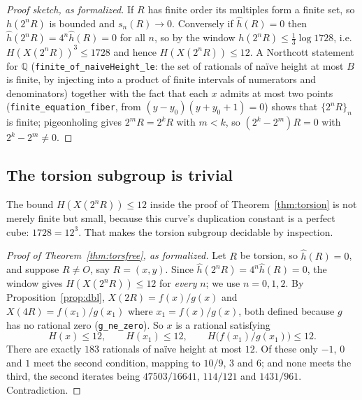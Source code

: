 \documentclass[11pt,reqno]{amsart}
\theoremstyle{plain}
\theoremstyle{definition}
\theoremstyle{remark}
\DeclareRobustCommand{\lt}[1]{\texttt{#1}}
\newcommand{\hh}{\widehat{h}}
\newcommand{\nh}{H}
\begin{document}
\begin{proof}[Proof sketch, as formalized]
If $R$ has finite order its multiples form a finite set, so $h(2^nR)$ is
bounded and $s_n(R) \to 0$. Conversely if $\hh(R) = 0$ then
$\hh(2^nR) = 4^n \hh(R) = 0$ for all $n$, so by the window
$h(2^nR) \le \tfrac13\log 1728$, i.e. $\nh(X(2^nR))^3 \le 1728$ and hence
$\nh(X(2^nR)) \le 12$. A Northcott statement for $\mathbb{Q}$
(\lt{finite\_of\_naiveHeight\_le}: the set of rationals of na\"ive height at
most $B$ is finite, by injecting into a product of finite intervals of
numerators and denominators) together with the fact that each $x$ admits at
most two points (\lt{finite\_equation\_fiber}, from
$(y-y_0)(y+y_0+1) = 0$) shows that $\{2^nR\}_n$ is finite; pigeonholing
gives $2^mR = 2^kR$ with $m < k$, so $(2^k - 2^m)R = 0$ with
$2^k - 2^m \ne 0$.
\end{proof}

\subsection{The torsion subgroup is trivial}

The bound $\nh(X(2^nR)) \le 12$ inside the proof of
Theorem~\ref{thm:torsion} is not merely finite but small, because this
curve's duplication constant is a perfect cube: $1728 = 12^3$. That makes
the torsion subgroup decidable by inspection.

\begin{proof}[Proof of Theorem~\ref{thm:torsfree}, as formalized]
Let $R$ be torsion, so $\hh(R) = 0$, and suppose $R \ne O$, say
$R = (x,y)$. Since $\hh(2^nR) = 4^n\hh(R) = 0$, the window gives
$\nh(X(2^nR)) \le 12$ for \emph{every} $n$; we use $n = 0, 1, 2$. By
Proposition~\ref{prop:dbl}, $X(2R) = f(x)/g(x)$ and
$X(4R) = f(x_1)/g(x_1)$ where $x_1 = f(x)/g(x)$, both defined because $g$
has no rational zero (\lt{g\_ne\_zero}). So $x$ is a rational satisfying
\[
  \nh(x) \le 12, \qquad \nh(x_1) \le 12, \qquad
  \nh\bigl(f(x_1)/g(x_1)\bigr) \le 12 .
\]
There are exactly $183$ rationals of na\"ive height at most $12$. Of these
only $-1$, $0$ and $1$ meet the second condition, mapping to $10/9$, $3$
and $6$; and none meets the third, the second iterates being
$47503/16641$, $114/121$ and $1431/961$. Contradiction.
\end{proof}
\end{document}

